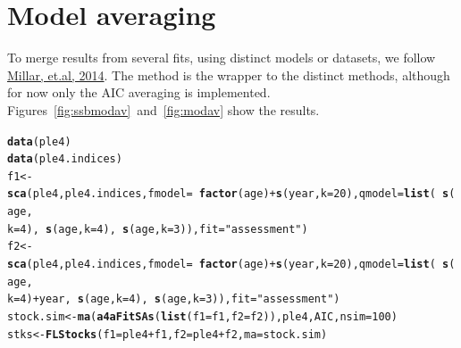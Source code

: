 \documentclass[a4paper,english,10pt]{article}\usepackage[]{graphicx}\usepackage[]{color}
\makeatletter
\newcommand{\hlnum}[1]{\textcolor[rgb]{0.686,0.059,0.569}{#1}}%
\newcommand{\hlstr}[1]{\textcolor[rgb]{0.192,0.494,0.8}{#1}}%
\newcommand{\hlopt}[1]{\textcolor[rgb]{0,0,0}{#1}}%
\newcommand{\hlstd}[1]{\textcolor[rgb]{0.345,0.345,0.345}{#1}}%
\newcommand{\hlkwb}[1]{\textcolor[rgb]{0.69,0.353,0.396}{#1}}%
\newcommand{\hlkwc}[1]{\textcolor[rgb]{0.333,0.667,0.333}{#1}}%
\newcommand{\hlkwd}[1]{\textcolor[rgb]{0.737,0.353,0.396}{\textbf{#1}}}%
\newenvironment{kframe}{%
 \def\at@end@of@kframe{}%
 \ifinner\ifhmode%
  \def\at@end@of@kframe{\end{minipage}}%
  \begin{minipage}{\columnwidth}%
 \fi\fi%
 \def\FrameCommand##1{\hskip\@totalleftmargin \hskip-\fboxsep
 \colorbox{shadecolor}{##1}\hskip-\fboxsep
     \hskip-\linewidth \hskip-\@totalleftmargin \hskip\columnwidth}%
 \MakeFramed {\advance\hsize-\width
   \@totalleftmargin\z@ \linewidth\hsize
   \@setminipage}}%
 {\par\unskip\endMakeFramed%
 \at@end@of@kframe}
\newenvironment{knitrout}{}{} %
\makeatother
\begin{document}



\section{Model averaging}

To merge results from several fits, using distinct models or datasets, we follow \href{http://icesjms.oxfordjournals.org/content/early/2014/03/31/icesjms.fsu043.abstract}{Millar, et.al, 2014}. The method  is the wrapper to the distinct methods, although for now only the AIC averaging is implemented. Figures~\ref{fig:ssbmodav}~and~\ref{fig:modav} show the results. 

\begin{knitrout}
\color{fgcolor}\begin{kframe}
\begin{alltt}
\hlkwd{data}\hlstd{(ple4)}
\hlkwd{data}\hlstd{(ple4.indices)}
\hlstd{f1} \hlkwb{<-} \hlkwd{sca}\hlstd{(ple4, ple4.indices,} \hlkwc{fmodel} \hlstd{=} \hlopt{~}\hlkwd{factor}\hlstd{(age)} \hlopt{+} \hlkwd{s}\hlstd{(year,} \hlkwc{k} \hlstd{=} \hlnum{20}\hlstd{),} \hlkwc{qmodel} \hlstd{=} \hlkwd{list}\hlstd{(}\hlopt{~}\hlkwd{s}\hlstd{(age,}
    \hlkwc{k} \hlstd{=} \hlnum{4}\hlstd{),} \hlopt{~}\hlkwd{s}\hlstd{(age,} \hlkwc{k} \hlstd{=} \hlnum{4}\hlstd{),} \hlopt{~}\hlkwd{s}\hlstd{(age,} \hlkwc{k} \hlstd{=} \hlnum{3}\hlstd{)),} \hlkwc{fit} \hlstd{=} \hlstr{"assessment"}\hlstd{)}
\hlstd{f2} \hlkwb{<-} \hlkwd{sca}\hlstd{(ple4, ple4.indices,} \hlkwc{fmodel} \hlstd{=} \hlopt{~}\hlkwd{factor}\hlstd{(age)} \hlopt{+} \hlkwd{s}\hlstd{(year,} \hlkwc{k} \hlstd{=} \hlnum{20}\hlstd{),} \hlkwc{qmodel} \hlstd{=} \hlkwd{list}\hlstd{(}\hlopt{~}\hlkwd{s}\hlstd{(age,}
    \hlkwc{k} \hlstd{=} \hlnum{4}\hlstd{)} \hlopt{+} \hlstd{year,} \hlopt{~}\hlkwd{s}\hlstd{(age,} \hlkwc{k} \hlstd{=} \hlnum{4}\hlstd{),} \hlopt{~}\hlkwd{s}\hlstd{(age,} \hlkwc{k} \hlstd{=} \hlnum{3}\hlstd{)),} \hlkwc{fit} \hlstd{=} \hlstr{"assessment"}\hlstd{)}
\hlstd{stock.sim} \hlkwb{<-} \hlkwd{ma}\hlstd{(}\hlkwd{a4aFitSAs}\hlstd{(}\hlkwd{list}\hlstd{(}\hlkwc{f1} \hlstd{= f1,} \hlkwc{f2} \hlstd{= f2)), ple4, AIC,} \hlkwc{nsim} \hlstd{=} \hlnum{100}\hlstd{)}
\hlstd{stks} \hlkwb{<-} \hlkwd{FLStocks}\hlstd{(}\hlkwc{f1} \hlstd{= ple4} \hlopt{+} \hlstd{f1,} \hlkwc{f2} \hlstd{= ple4} \hlopt{+} \hlstd{f2,} \hlkwc{ma} \hlstd{= stock.sim)}
\end{alltt}
\end{kframe}
\end{knitrout}
\end{document}
